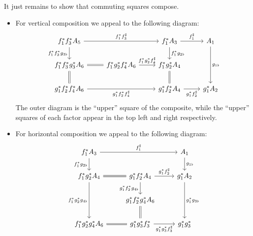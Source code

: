 \documentclass[DynamicalBook]{subfiles}
\begin{document}
It just remains to show that commuting squares compose.
\begin{itemize}
\item For vertical composition we appeal to the following diagram:
  \[
    \begin{tikzcd}
      f_1^{\ast}f_3^{\ast} A_5 \arrow[rr, "f_1^{\ast}f_3^{\sharp}"] \arrow[d, "f_1^{\ast}f_3^{\ast}g_{3\flat}"'] &                                                                                 & f_1^{\ast}A_3 \arrow[r, "f_1^{\sharp}"] \arrow[d, "f_1^{\ast}g_{2\flat}"] & A_1 \arrow[dd, "g_{1\flat}"] \\
      f_1^{\ast}f_3^{\ast}g_3^{\ast}A_6 \arrow[d,equals] \arrow[r,equals]                                                       & f_1^{\ast}g_2^{\ast}f_4^{\ast}A_6 \arrow[r, "f_1^{\ast}g_2^{\ast}f_4^{\sharp}"] & f_1^{\ast}g_2^{\ast}A_4 \arrow[d,equals]                                           &                               \\
      g_1^{\ast}f_2^{\ast}f_4^{\ast}A_6 \arrow[rr,
      "g_1^{\ast}f_2^{\ast}f_4^{\sharp}"'] & & g_1^{\ast}f_2^{\ast}A_4 \arrow[r,
      "g_1^{\ast}f_2^{\sharp}"'] & g_1^{\ast}A_2
    \end{tikzcd}
  \]
  The outer diagram is the ``upper'' square of the composite, while the
  ``upper'' squares of each factor appear in the top left and right
  respectively.
\item For horizontal composition we appeal to the following diagram:
  \[
    \begin{tikzcd}
      f_1^{\ast}A_3 \arrow[rr, "f_1^{\sharp}"] \arrow[d, "f_1^{\ast}g_{2\flat}"']     &                                                                                                           & A_1 \arrow[d, "g_{1\flat}"]                      \\
      f_1^{\ast}g_2^{\ast}A_4 \arrow[r,equals] \arrow[dd, "f_1^{\ast}g_2^{\ast}g_{4\flat}"'] & g_1^{\ast}f_2^{\ast}A_4 \arrow[r, "g_1^{\ast}f_2^{\sharp}"] \arrow[d, "g_1^{\ast}f_2^{\ast}g_{4\flat}"'] & g_1^{\ast}A_2 \arrow[dd, "g_1^{\ast}g_{3\flat}"] \\
      & g_1^{\ast}f_2^{\ast}g_4^{\ast}A_6 \arrow[d,equals]                                                               &                                                   \\
      f_1^{\ast}g_2^{\ast}g_4^{\ast}A_6 \arrow[r,equals] &
      g_1^{\ast}g_3^{\ast}f_3^{\ast} \arrow[r,
      "g_1^{\ast}g_3^{\ast}f_3^{\sharp}"'] & g_1^{\ast}g_3^{\ast}
    \end{tikzcd}
  \]
\end{itemize}
\end{document}
